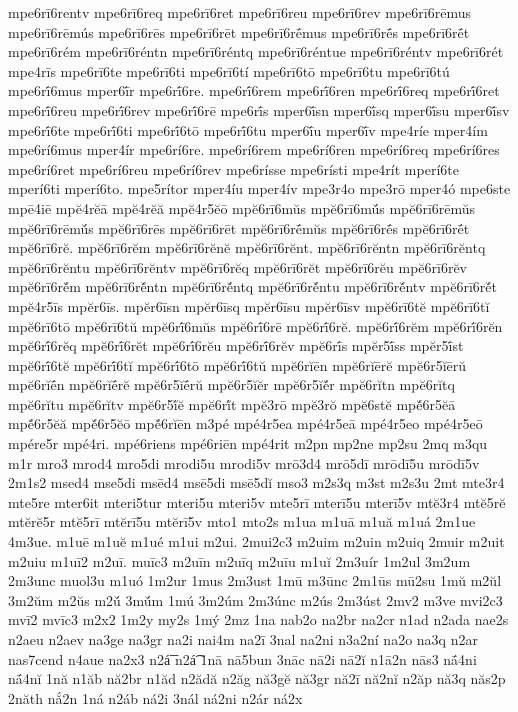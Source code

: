 {mpe6rī6rentv
mpe6rī6req
mpe6rī6ret
mpe6rī6reu
mpe6rī6rev
mpe6rī6rēmus
mpe6rī6rēmús
mpe6rī6rēs
mpe6rī6rēt
mpe6rī6rḗmus
mpe6rī6rḗs
mpe6rī6rḗt
mpe6rī6rém
mpe6rī6réntn
mpe6rī6réntq
mpe6rī6réntue
mpe6rī6réntv
mpe6rī6rét
mpe4rīs
mpe6rī6te
mpe6rī6ti
mpe6rī6tí
mpe6rī6tō
mpe6rī6tu
mpe6rī6tú
mpe6rī́6mus
mper6ī́r
mpe6rī́6re.
mpe6rī́6rem
mpe6rī́6ren
mpe6rī́6req
mpe6rī́6ret
mpe6rī́6reu
mpe6rī́6rev
mpe6rī́6rē
mpe6rī́s
mper6ī́sn
mper6ī́sq
mper6ī́su
mper6ī́sv
mpe6rī́6te
mpe6rī́6ti
mpe6rī́6tō
mpe6rī́6tu
mper6ī́u
mper6ī́v
mpe4ríe
mper4ím
mpe6rí6mus
mper4ír
mpe6rí6re.
mpe6rí6rem
mpe6rí6ren
mpe6rí6req
mpe6rí6res
mpe6rí6ret
mpe6rí6reu
mpe6rí6rev
mpe6rísse
mpe6rísti
mpe4rít
mperí6te
mperí6ti
mperí6to.
mpe5rítor
mper4íu
mper4ív
mpe3r4o
mpe3rō
mper4ó
mpe6ste
mpē4iē
mpĕ4rĕā
mpĕ4rĕă
mpĕ4r5ĕō
mpĕ6rī6mŭs
mpĕ6rī6mŭ́s
mpĕ6rī6rēmŭs
mpĕ6rī6rēmŭ́s
mpĕ6rī6rēs
mpĕ6rī6rēt
mpĕ6rī6rḗmŭs
mpĕ6rī6rḗs
mpĕ6rī6rḗt
mpĕ6rī6rĕ.
mpĕ6rī6rĕm
mpĕ6rī6rĕnĕ
mpĕ6rī6rĕnt.
mpĕ6rī6rĕntn
mpĕ6rī6rĕntq
mpĕ6rī6rĕntu
mpĕ6rī6rĕntv
mpĕ6rī6rĕq
mpĕ6rī6rĕt
mpĕ6rī6rĕu
mpĕ6rī6rĕv
mpĕ6rī6rĕ́m
mpĕ6rī6rĕ́ntn
mpĕ6rī6rĕ́ntq
mpĕ6rī6rĕ́ntu
mpĕ6rī6rĕ́ntv
mpĕ6rī6rĕ́t
mpĕ4r5īs
mpĕr6īs.
mpĕr6īsn
mpĕr6īsq
mpĕr6īsu
mpĕr6īsv
mpĕ6rī6tĕ
mpĕ6rī6tĭ
mpĕ6rī6tō
mpĕ6rī6tŭ
mpĕ6rī́6mŭs
mpĕ6rī́6rē
mpĕ6rī́6rĕ.
mpĕ6rī́6rĕm
mpĕ6rī́6rĕn
mpĕ6rī́6rĕq
mpĕ6rī́6rĕt
mpĕ6rī́6rĕu
mpĕ6rī́6rĕv
mpĕ6rī́s
mpĕr5ī́ss
mpĕr5ī́st
mpĕ6rī́6tĕ
mpĕ6rī́6tĭ
mpĕ6rī́6tō
mpĕ6rī́6tŭ
mpĕ6rĭēn
mpĕ6rĭērĕ
mpĕ6r5ĭērŭ
mpĕ6rĭḗn
mpĕ6rĭḗrĕ
mpĕ6r5ĭḗrŭ
mpĕ6r5ĭĕr
mpĕ6r5ĭĕ́r
mpĕ6rĭtn
mpĕ6rĭtq
mpĕ6rĭtu
mpĕ6rĭtv
mpĕ6r5ĭ́ĕ
mpĕ6rĭ́t
mpĕ3rō
mpĕ3rŏ
mpĕ6stĕ
mpĕ́6r5ĕā
mpĕ́6r5ĕă
mpĕ́6r5ĕō
mpĕ́6rĭēn
m3pé
mpé4r5ea
mpé4r5eā
mpé4r5eo
mpé4r5eō
mpére5r
mpé4ri.
mpé6riens
mpé6riēn
mpé4rit
m2pn
mp2ne
mp2su
2mq
m3qu
m1r
mro3
mrod4
mro5di
mrodi5u
mrodi5v
mrō3d4
mrō5dī
mrōdī5u
mrōdī5v
2m1s2
msed4
mse5di
msēd4
msē5di
msē5dĭ
mso3
m2s3q
m3st
m2s3u
2mt
mte3r4
mte5re
mter6it
mteri5tur
mteri5u
mteri5v
mte5rī
mterī5u
mterī5v
mtĕ3r4
mtĕ5rĕ
mtĕrĕ5r
mtĕ5rī
mtĕrī5u
mtĕrī5v
mto1
mto2s
m1ua
m1uā
m1uă
m1uá
2m1ue
4m3ue.
m1uē
m1uĕ
m1ué
m1ui
m2ui.
2mui2c3
m2uim
m2uin
m2uiq
2muir
m2uit
m2uiu
m1uī2
m2uī.
muīc3
m2uīn
m2uīq
m2uīu
m1uĭ
2m3uír
1m2ul
3m2um
2m3unc
muol3u
m1uó
1m2ur
1mus
2m3ust
1mū
m3ūnc
2m1ūs
mū2su
1mŭ
m2ŭl
3m2ŭm
m2ŭs
m2ŭ́
3mŭ́m
1mú
3m2úm
2m3únc
m2ús
2m3úst
2mv2
m3ve
mvi2c3
mvī2
mvīc3
m2x2
1m2y
my2s
1mý
2mz
1na
nab2o
na2br
na2cr
n1ad
n2ada
nae2s
n2aeu
n2aev
na3ge
na3gr
na2i
nai4m
na2ī
3nal
na2ni
n3a2ní
na2o
na3q
n2ar
nas7cend
n4aue
na2x3
n2á͞
n2á͡
1nā
nā5bun
3nāc
nā2i
nā2ĭ
n1ā2n
nās3
nā́4ni
nā́4nĭ
1nă
n1ăb
nă2br
n1ăd
n2ădă
n2ăg
nă3gĕ
nă3gr
nă2ī
nă2nĭ
n2ăp
nă3q
năs2p
2năth
nắ2n
1ná
n2áb
ná2i
3nál
ná2ni
n2ár
ná2x
}
